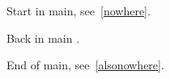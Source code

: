 \documentclass{article}
\begin{document}
Start in main, see~\ref{nowhere}.



Back in main \undefinedinmain.





End of main, see~\ref{alsonowhere}.
\end{document}
